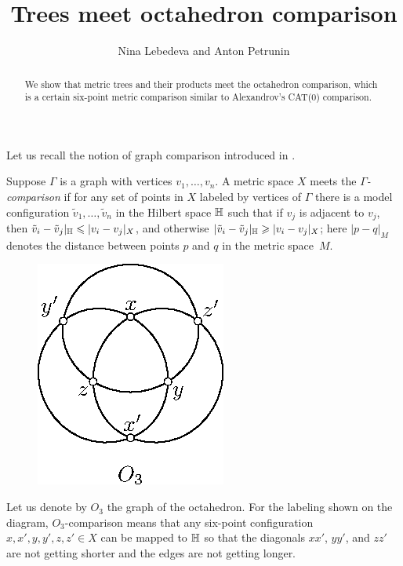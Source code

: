 \documentclass{article}
\def\thetitle{Trees meet octahedron comparison}
\def\theauthors{Nina Lebedeva and Anton Petrunin}
\begin{document}


\title{\thetitle}
\author{\theauthors}

\date{}
\maketitle
\begin{abstract}
We show that metric trees and their products meet the octahedron comparison, which is a certain six-point metric comparison similar to Alexandrov's CAT(0) comparison. 
\end{abstract}


Let us recall the notion of graph comparison introduced in \cite{lebedeva-petrunin-zolotov}.

Suppose $\Gamma$ is a graph with vertices $v_1,\dots,v_n$.
A metric space $X$ meets the \emph{$\Gamma$-comparison} if for any set of points in $X$ labeled by vertices of $\Gamma$ there is a model configuration $\tilde v_1,\dots,\tilde v_n$ in the Hilbert space $\mathbb H$ such that 
if $v_j$ is adjacent to $v_j$, then
$\tilde v_i-\tilde v_j|_{\mathbb H}\leqslant | v_i-v_j|_{X}$,
and otherwise
$|\tilde v_i-\tilde v_j|_{\mathbb H}\geqslant | v_i-v_j|_{X}$;
here $|p-q|_M$ denotes the distance between points $p$ and $q$ in the metric space~$M$.

\begin{figure}
\vskip-3mm
\centering
\includegraphics{mppics/pic-30}
\end{figure}

Let us denote by $O_3$ the graph of the octahedron.
For the labeling shown on the diagram, $O_3$-comparison means that any six-point configuration $x,x',y,y',z,z'\in X$ can be mapped to $\mathbb H$ so that the diagonals $xx'$, $yy'$, and $zz'$ are not getting shorter
and the edges are not getting longer.
\end{document}

